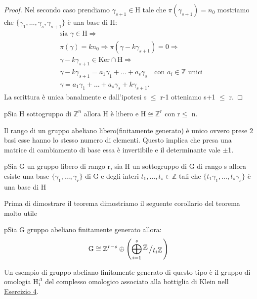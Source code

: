 \documentclass[11pt, a4paper, twoside]{article}
\newcommand{\bigslant}[2]{{\raisebox{.2em}{$#1$}\left/\raisebox{-.2em}{$#2$}\right.}}
\begin{document}
\begin{proof}
	Nel secondo caso prendiamo $\gamma_{s+1}\in\text{H}$ tale che $\pi(\gamma_{s+1})=n_0$ mostriamo che $\{\gamma_1,\dots,\gamma_s,\gamma_{s+1}\}$ è una base di H: 
	\begin{align*}
		&\text{sia }\gamma\in\text{H}\Rightarrow \\ 
		&\pi(\gamma)=kn_0 \Rightarrow \pi(\gamma-k\gamma_{s+1})=0 \Rightarrow \\ 
		& \gamma-k\gamma_{s+1}\in\text{Ker}\cap\text{H}\Rightarrow\\ 
		&\gamma-k\gamma_{s+1}=a_1\gamma_1+\dots+a_s\gamma_s\quad \text{con }a_i\in\mathbb{Z}\text{ unici}\\ 
		&\gamma=a_1\gamma_1+\dots+a_s\gamma_s+k\gamma_{s+1}.
	\end{align*}
	La scrittura è unica banalmente e dall'ipotesi s $\leq$ r-1 otteniamo s+1 $\leq$ r.
\end{proof}

\begin{cor}{}
	pSia H sottogruppo di $\mathbb{Z}^n$ allora H è libero e H$\cong\mathbb{Z}^r$ con r$\leq$ n.
\end{cor}
\begin{oss}
	Il rango di un gruppo abeliano libero(finitamente generato) è unico ovvero prese 2 basi esse hanno lo stesso numero di elementi. Questo implica che presa una matrice di cambiamento di base essa è invertibile e il determinante vale $\pm$1.
\end{oss}
\label{Teorema 2.1.5}
\begin{thm}{}
	pSia G un gruppo libero di rango r, sia H un sottogruppo di G di rango s allora esiste una base $\{\gamma_1,\dots,\gamma_r\}$ di G e degli interi $t_1,\dots,t_s\in\mathbb{Z}$ tali che $\{t_1\gamma_1,\dots,t_s\gamma_s\}$ è una base di H 
\end{thm}

Prima di dimostrare il teorema dimostriamo il seguente corollario del teorema molto utile 
\begin{cor}{}
	pSia G gruppo abeliano finitamente generato allora:
	\[
		\text{G}\cong\mathbb{Z}^{r-s} \oplus \left(\bigoplus\limits_{i=1}^s\bigslant{\mathbb{Z}}{t_i\mathbb{Z}}\right)
	\]
\end{cor}

\begin{es}
	Un esempio di gruppo abeliano finitamente generato di questo tipo è il gruppo di omologia $\text{H}_1^{\Delta}$ del complesso omologico associato alla bottiglia di Klein nell \hyperref[Bottiglia di Klein]{Esercizio 4}.
\end{es}
\end{document}

